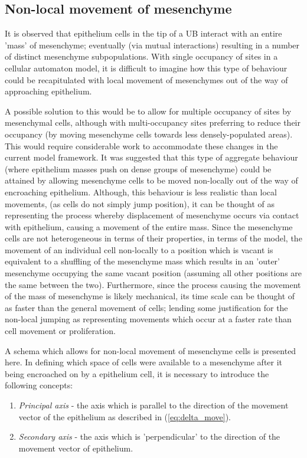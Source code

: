 \documentclass[pdftex,10pt,a4paper]{article}
\begin{document}
\subsection{Non-local movement of mesenchyme}\label{sec:nonlocal}
It is observed that epithelium cells in the tip of a UB interact with an entire 'mass' of mesenchyme; eventually (via mutual interactions) resulting in a number of distinct mesenchyme subpopulations. With single occupancy of sites in a cellular automaton model, it is difficult to imagine how this type of behaviour could be recapitulated with local movement of mesenchymes out of the way of approaching epithelium. 

A possible solution to this would be to allow for multiple occupancy of sites by mesenchymal cells, although with multi-occupancy sites preferring to reduce their occupancy (by moving mesenchyme cells towards less densely-populated areas). This would require considerable work to accommodate these changes in the current model framework. It was suggested that this type of aggregate behaviour (where epithelium masses push on dense groups of mesenchyme) could be attained by allowing mesenchyme cells to be moved non-locally out of the way of encroaching epithelium. Although, this behaviour is less realistic than local movements, (as cells do not simply jump position), it can be thought of as representing the process whereby displacement of mesenchyme occurs via contact with epithelium, causing a movement of the entire mass. Since the mesenchyme cells are not heterogeneous in terms of their properties, in terms of the model, the movement of an individual cell non-locally to a position which is vacant is equivalent to a shuffling of the mesenchyme mass which results in an 'outer' mesenchyme occupying the same vacant position (assuming all other positions are the same between the two). Furthermore, since the process causing the movement of the mass of mesenchyme is likely mechanical, its time scale can be thought of as faster than the general movement of cells; lending some justification for the non-local jumping as representing movements which occur at a faster rate than cell movement or proliferation.

A schema which allows for non-local movement of mesenchyme cells is presented here. In defining which space of cells were available to a mesenchyme after it being encroached on by a epithelium cell, it is necessary to introduce the following concepts:

\begin{enumerate}
\item \textit{Principal axis} - the axis which is parallel to the direction of the movement vector of the epithelium as described in (\ref{eq:delta_move}).
\item \textit{Secondary axis} - the axis which is 'perpendicular' to the direction of the movement vector of epithelium.
\end{enumerate}
\end{document}
